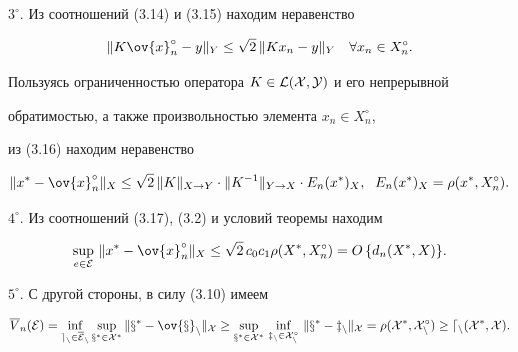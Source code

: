 $3^\circ$. Из соотношений (3.14) и (3.15) находим неравенство


\begin{equation}


\|K\ov{x}_n^\circ -y\|_Y \leq \sqrt{2}\, \|Kx_n-y\|_Y \quad


\forall x_n\in X_n^\circ .


\end{equation}


Пользуясь ограниченностью оператора $K\in \cal L(X, Y)$ и его непрерывной


обратимостью, а также произвольностью элемента $x_n\in X_n^\circ$,


из (3.16) находим неравенство


\begin{equation}


\|x^*-\ov{x}_n^\circ\|_X\leq \sqrt{2}\, 


\|K\|_{X\rightarrow Y}\cdot


\|K^{-1}\|_{Y\rightarrow X}\cdot E_n(x^*)_X ,


\ \; E_n(x^*)_X =\rho(x^*, X_n^\circ ).


\end{equation}





$4^\circ$. Из соотношений (3.17), (3.2) и условий теоремы находим


\begin{equation}


\sup_{e\in \cal E}\, \|x^*-\ov{x}_n^\circ\|_X\leq \sqrt{2}\, c_0c_1


\rho(X^*,X_n^\circ )=O\, \{ d_n(X^*,X)\} .


\end{equation}





$5^\circ $. С другой стороны, в силу (3.10) имеем


\begin{equation}


\overline{V}_n(\cal E)=\inf_{e_n\in \overline{\cal E}_n}


\sup_{x^*\in X^*}\|x^* -\ov{x}_n\|_X \geq 


\sup_{x^*\in X^*}\, \inf_{\mathstrut z_n\in X_n^\circ }\, \|x^*-z_n\|_X =


\rho(X^*,X_n^\circ )\geq d_n(X^*,X).


\end{equation}



